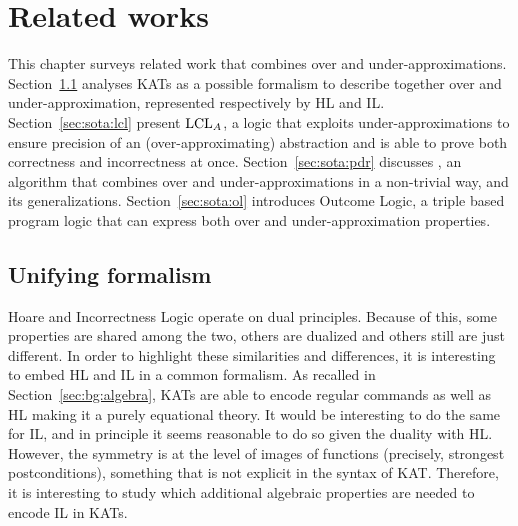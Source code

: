 
\chapter{Related works}\label{ch:sota}
This chapter surveys related work that combines over and under-approximations.
Section~\ref{sec:sota:kat} analyses KATs as a possible formalism to describe together over and under-approximation, represented respectively by HL and IL.
Section~\ref{sec:sota:lcl} present $\text{LCL}_A$, a logic that exploits under-approximations to ensure precision of an (over-approximating) abstraction and is able to prove both correctness and incorrectness at once.
Section~\ref{sec:sota:pdr} discusses , an algorithm that combines over and under-approximations in a non-trivial way, and its generalizations.
Section~\ref{sec:sota:ol} introduces Outcome Logic, a triple based program logic that can express both over and under-approximation properties.

\section{Unifying formalism}\label{sec:sota:kat}
Hoare and Incorrectness Logic operate on dual principles. Because of this, some properties are shared among the two, others are dualized and others still are just different. In order to highlight these similarities and differences, it is interesting to embed HL and IL in a common formalism. As recalled in Section~\ref{sec:bg:algebra}, KATs are able to encode regular commands \cite{Kozen97} as well as HL \cite{Kozen00} making it a purely equational theory.
It would be interesting to do the same for IL, and in principle it seems reasonable to do so given the duality with HL. However, the symmetry is at the level of images of functions (precisely, strongest postconditions), something that is not explicit in the syntax of KAT. Therefore, it is interesting to study which additional algebraic properties are needed to encode IL in KATs.

